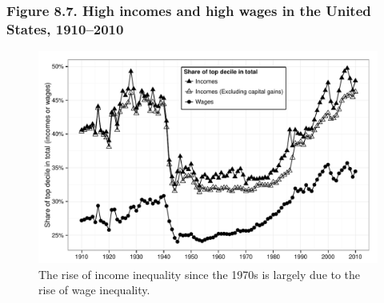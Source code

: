 \documentclass[t]{beamer}\usepackage[]{graphicx}\usepackage[]{color}
\newenvironment{knitrout}{}{} %
\begin{document}
\begin{frame}[label=Figure_8_7,fragile]
\frametitle{Figure 8.7. High incomes and high wages in the United States, 1910--2010}
\begin{figure}[t]
\begin{minipage}[b]{\textwidth}
\centering
\begin{knitrout}\footnotesize
{}\color{fgcolor}

{\centering \includegraphics[width=1\linewidth]{figures/bw/Figure_8_7} 

}



\end{knitrout}
\caption{The rise of income inequality since the 1970s is largely due to the rise of wage inequality.}
\end{minipage}
\end{figure}
\end{frame}
\end{document}
